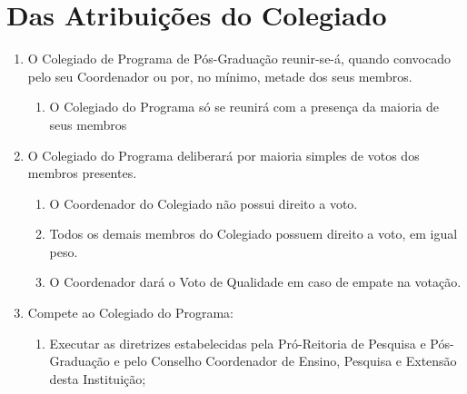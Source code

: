 \documentclass{article}
\newcommand{\singleitem}{\item[Parágrafo Único.]}
\begin{document}
\section{Das Atribuições do Colegiado}
\begin{enumerate}



	\item O Colegiado de Programa de Pós-Graduação reunir-se-á, quando convocado pelo seu Coordenador ou por, no mínimo, metade dos seus membros.
	\begin{enumerate}
		\singleitem O Colegiado do Programa só se reunirá com a presença da maioria de seus membros
	\end{enumerate}

	\item O Colegiado do Programa deliberará por maioria simples de votos dos membros presentes.
	\begin{enumerate}
		\item O Coordenador do Colegiado não possui direito a voto.
		\item Todos os demais membros do Colegiado possuem direito a voto, em igual peso.
		\item O Coordenador dará o Voto de Qualidade em caso de empate na votação. %
	\end{enumerate}


	\item Compete ao Colegiado do Programa:
	\begin{enumerate}
		\item Executar as diretrizes estabelecidas pela Pró-Reitoria de Pesquisa e Pós-Graduação e pelo Conselho Coordenador de Ensino, Pesquisa e Extensão desta Instituição;


\end{enumerate}
\end{enumerate}
\end{document}
